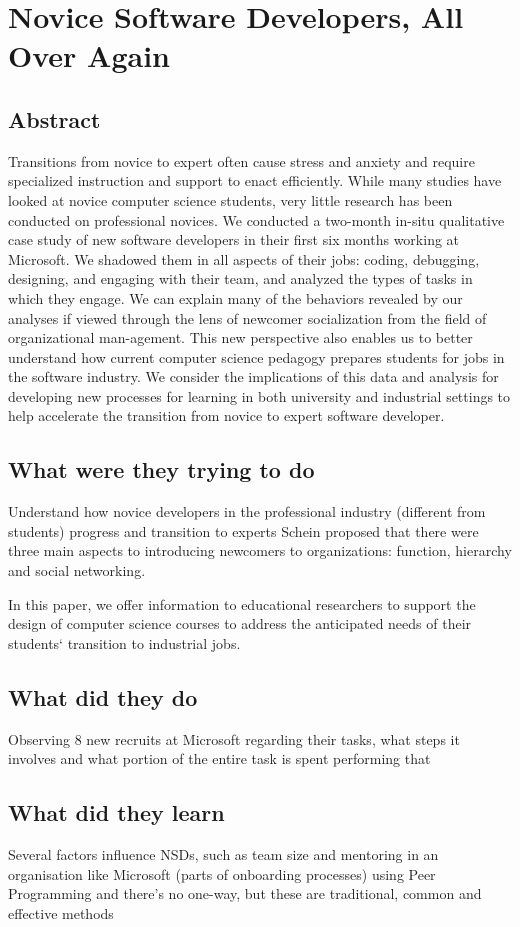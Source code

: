 \section{Novice Software Developers, All Over Again}

\subsection{Abstract}

Transitions from novice to expert often cause stress and anxiety and require specialized instruction and support to enact efficiently. While many studies have looked at novice computer science students, very little research has been conducted on professional novices. We conducted a two-month in-situ qualitative case study of new software developers in their first six months working at Microsoft. We shadowed them in all aspects of their jobs: coding, debugging, designing, and engaging with their team, and analyzed the types of tasks in which they engage. We can explain many of the behaviors revealed by our analyses if viewed through the lens of newcomer socialization from the field of organizational man-agement. This new perspective also enables us to better understand how current computer science pedagogy prepares students for jobs in the software industry. We consider the implications of this data and analysis for developing new processes for learning in both university and industrial settings to help accelerate the transition from novice to expert software developer.

\subsection{What were they trying to do}

Understand how novice developers in the professional industry (different from students) progress and transition to experts
Schein \cite{gallosOrganizationDevelopmentJosseyBass2017} proposed that there were three main aspects to introducing newcomers to organizations: function, hierarchy and social networking.

In this paper, we offer information to educational researchers to support the design of computer science courses to address the anticipated needs of their students‘ transition to industrial jobs.

\subsection{What did they do}

Observing 8 new recruits at Microsoft regarding their tasks, what steps it involves and what portion of the entire task is spent performing that

\subsection{What did they learn}

Several factors influence NSDs, such as team size and mentoring in an organisation like Microsoft (parts of onboarding processes) using Peer Programming and there's no one-way, but these are traditional, common and effective methods

